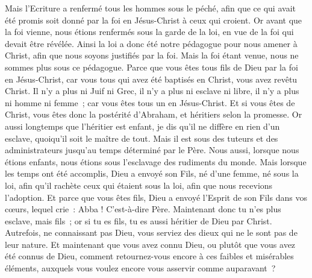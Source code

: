 \begin{multicols}{2}
Mais l'Ecriture a renfermé tous les hommes sous le péché, afin que ce qui avait été promis soit donné par la foi en Jésus-Christ à ceux qui croient.
Or avant que la foi vienne, nous étions renfermés sous la garde de la loi, en vue de la foi qui devait être révélée.
Ainsi la loi a donc été notre pédagogue pour nous amener à Christ, afin que nous soyons justifiés par la foi.
Mais la foi étant venue, nous ne sommes plus sous ce pédagogue.
Parce que vous êtes tous fils de Dieu par la foi en Jésus-Christ,
car vous tous qui avez été baptisés en Christ, vous avez revêtu Christ.
Il n'y a plus ni Juif ni Grec, il n'y a plus ni esclave ni libre, il n'y a plus ni homme ni femme~; car vous êtes tous un en Jésus-Christ.
Et si vous êtes de Christ, vous êtes donc la postérité d'Abraham, et héritiers selon la promesse.
\VerseOne{}Or aussi longtemps que l'héritier est enfant, je dis qu'il ne diffère en rien d'un esclave, quoiqu'il soit le maître de tout.
Mais il est sous des tuteurs et des administrateurs jusqu'au temps déterminé par le Père.
Nous aussi, lorsque nous étions enfants, nous étions sous l'esclavage des rudiments du monde.
Mais lorsque les temps ont été accomplis, Dieu a envoyé son Fils, né d'une femme, né sous la loi,
afin qu'il rachète ceux qui étaient sous la loi, afin que nous recevions l'adoption.
Et parce que vous êtes fils, Dieu a envoyé l'Esprit de son Fils dans vos cœurs, lequel crie~: Abba ! C'est-à-dire Père.
Maintenant donc tu n'es plus esclave, mais fils~; or si tu es fils, tu es aussi héritier de Dieu par Christ.
Autrefois, ne connaissant pas Dieu, vous serviez des dieux qui ne le sont pas de leur nature.
Et maintenant que vous avez connu Dieu, ou plutôt que vous avez été connus de Dieu, comment retournez-vous encore à ces faibles et misérables éléments, auxquels vous voulez encore vous asservir comme auparavant~?

\end{multicols}
